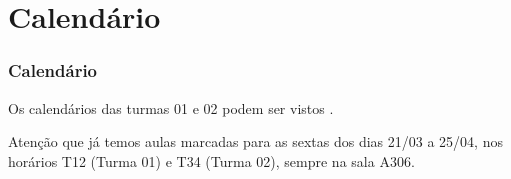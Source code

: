 \section{Calendário}


\begin{frame}
	\frametitle{Calendário} 

	Os calendários das turmas 01 e 02 podem ser vistos .

	Atenção que já temos aulas marcadas para as sextas dos dias 21/03 a 25/04, nos horários T12 (Turma 01) e T34 (Turma 02), sempre na sala A306.
\end{frame}
